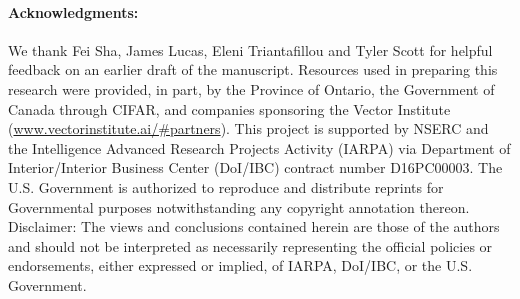 \paragraph{Acknowledgments:} 
We thank Fei Sha, James Lucas, Eleni Triantafillou and Tyler Scott for helpful feedback on an earlier draft of
the manuscript. 
Resources used in preparing this research were provided, in part, by the
Province of Ontario, the Government of Canada through CIFAR, and companies
sponsoring the Vector Institute (\url{www.vectorinstitute.ai/\#partners}).
This project is supported by NSERC and the Intelligence Advanced Research Projects
Activity (IARPA) via Department of Interior/Interior Business Center (DoI/IBC) contract number
D16PC00003. The U.S. Government is authorized to reproduce and distribute reprints for Governmental
purposes notwithstanding any copyright annotation thereon. Disclaimer: The views and conclusions
contained herein are those of the authors and should not be interpreted as necessarily representing
the official policies or endorsements, either expressed or implied, of IARPA, DoI/IBC, or the U.S.
Government.